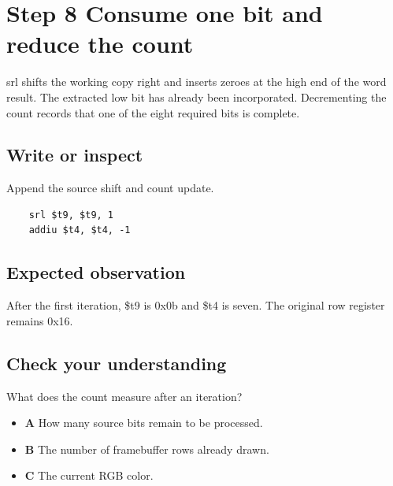\section{Step 8 Consume one bit and reduce the
  count}\label{003-eight-byte-sprite-s08-step-8-consume-one-bit-and-reduce-the-count}

srl shifts the working copy right and inserts zeroes at the high end of
the word result. The extracted low bit has already been incorporated.
Decrementing the count records that one of the eight required bits is
complete.

\subsection{Write or
  inspect}\label{003-eight-byte-sprite-s08-write-or-inspect}

Append the source shift and count update.

\begin{verbatim}
    srl $t9, $t9, 1
    addiu $t4, $t4, -1
\end{verbatim}

\subsection{Expected
  observation}\label{003-eight-byte-sprite-s08-expected-observation}

After the first iteration, \$t9 is 0x0b and \$t4 is seven. The original
row register remains 0x16.

\subsection{Check your
  understanding}\label{003-eight-byte-sprite-s08-check-your-understanding}

What does the count measure after an iteration?

\begin{itemize}
  \tightlist
  \item
        \textbf{A} How many source bits remain to be processed.
  \item
        \textbf{B} The number of framebuffer rows already drawn.
  \item
        \textbf{C} The current RGB color.
\end{itemize}

